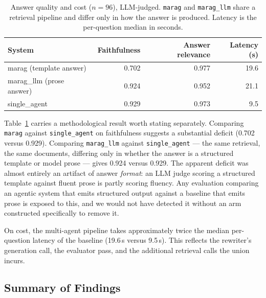 \begin{table}[t]
\caption{Answer quality and cost ($n=96$), LLM-judged. \texttt{marag} and
\texttt{marag\_llm} share a retrieval pipeline and differ only in how the answer
is produced. Latency is the per-question median in seconds.}
\label{tab:scaled-answer}
\begin{tabular}{lrrr}
\toprule
System & Faithfulness & Answer relevance & Latency (s) \\
\midrule
marag (template answer) & 0.702 & 0.977 & 19.6 \\
marag\_llm (prose answer) & 0.924 & 0.952 & 21.1 \\
single\_agent & 0.929 & 0.973 & 9.5 \\
\bottomrule
\end{tabular}
\end{table}

Table~\ref{tab:scaled-answer} carries a methodological result worth stating
separately. Comparing \texttt{marag} against \texttt{single\_agent} on
faithfulness suggests a substantial deficit (0.702 versus 0.929). Comparing
\texttt{marag\_llm} against \texttt{single\_agent} --- the same retrieval, the
same documents, differing only in whether the answer is a structured template or
model prose --- gives 0.924 versus 0.929. The apparent deficit was almost
entirely an artifact of answer \emph{format}: an LLM judge scoring a structured
template against fluent prose is partly scoring fluency. Any evaluation
comparing an agentic system that emits structured output against a baseline that
emits prose is exposed to this, and we would not have detected it without an arm
constructed specifically to remove it.

On cost, the multi-agent pipeline takes approximately twice the median
per-question latency of the baseline (19.6\,s versus 9.5\,s). This reflects the
rewriter's generation call, the evaluator pass, and the additional retrieval
calls the union incurs.

\subsection{Summary of Findings}\label{sec:results-summary}

